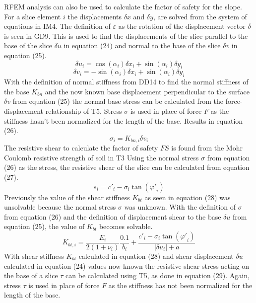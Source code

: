 \documentclass[12pt]{article}
\begin{document}
RFEM analysis can also be used to calculate the factor of safety for the slope. For a slice element $i$ the displacements $\delta{}x$ and $\delta{}y$, are solved from the system of equations in IM4. The definition of $\varepsilon{}$ as the rotation of the displacement vector $\delta{}$ is seen in GD9. This is used to find the displacements of the slice parallel to the base of the slice $\delta{}u$ in equation (24) and normal to the base of the slice $\delta{}v$ in equation (25).
\begin{dmath}
{\delta{}u}_{i}=\cos\left(\alpha{}_{i}\right) {\delta{}x}_{i}+\sin\left(\alpha{}_{i}\right) {\delta{}y}_{i}
\end{dmath}
\begin{dmath}
{\delta{}v}_{i}=-\sin\left(\alpha{}_{i}\right) {\delta{}x}_{i}+\sin\left(\alpha{}_{i}\right) {\delta{}y}_{i}
\end{dmath}
With the definition of normal stiffness from DD14 to find the normal stiffness of the base ${K_{bn}}$ and the now known base displacement perpendicular to the surface $\delta{}v$ from equation (25) the normal base stress can be calculated from the force-displacement relationship of T5. Stress $\sigma{}$ is used in place of force $F$ as the stiffness hasn't been normalized for the length of the base. Results in equation (26).
\begin{dmath}
\sigma{}_{i}={K_{bn,i}} {\delta{}v}_{i}
\end{dmath}
The resistive shear to calculate the factor of safety $FS$ is found from the Mohr Coulomb resistive strength of soil in T3 Using the normal stress $\sigma{}$ from equation (26) as the stress, the resistive shear of the slice can be calculated from equation (27).
\begin{dmath}
s_{i}={c'}_{i}-\sigma{}_{i} \tan\left({\varphi{}'}_{i}\right)
\end{dmath}
Previously the value of the shear stiffness ${K_{bt}}$ as seen in equation (28) was unsolvable because the normal stress $\sigma{}$ was unknown. With the definition of $\sigma{}$ from equation (26) and the definition of displacement shear to the base $\delta{}u$ from equation (25), the value of ${K_{bt}}$ becomes solvable.
\begin{dmath}
{K_{bt,i}}=\frac{E_{i}}{2 \left(1+\nu{}_{i}\right)} \frac{0.1}{b_{i}}+\frac{{c'}_{i}-\sigma{}_{i} \tan\left({\varphi{}'}_{i}\right)}{|{\delta{}u}_{i}|+a}
\end{dmath}
With shear stiffness ${K_{bt}}$ calculated in equation (28) and shear displacement $\delta{}u$ calculated in equation (24) values now known the resistive shear stress acting on the base of a slice $\tau{}$ can be calculated using T5, as done in equation (29). Again, stress $\tau{}$ is used in place of force $F$ as the stiffness has not been normalized for the length of the base.
\end{document}
